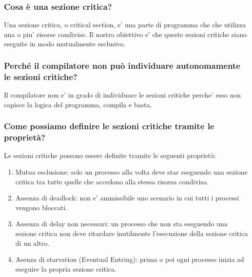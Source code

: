 \documentclass{article}
\begin{document}
\subsubsection{Cosa è una sezione critica?}
Una sezione critica, o critical section, e' una parte di programma che che
utilizza una o piu' risorse condivise. Il nostro obiettivo e' che queste
sezioni critiche siano eseguite in modo mutualmente esclusivo.

\subsubsection{Perché il compilatore non può individuare autonomamente le sezioni critiche?}
Il compilatore non e' in grado di individuare le sezioni critiche perche' esso
non capisce la logica del programma, compila e basta.

\subsubsection{Come possiamo definire le sezioni critiche tramite le proprietà?}
Le sezioni critiche possono essere definite tramite le seguenti proprietà:
\begin{enumerate}
    \item Mutua esclusione: solo un processo alla volta deve star eseguendo una sezione
          critica tra tutte quelle che accedono alla stessa risorsa condivisa.
    \item Assenza di deadlock: non e' ammissibile uno scenario in cui tutti i processi
          vengono bloccati.
    \item Assenza di delay non necessari: un processo che non sta eseguendo una sezione
          critica non deve ritardare inutilmente l'esecuzione della sezione critica di un
          altro.
    \item Asenza di starvation (Eventual Entring): prima o poi ogni processo inizia ad
          eseguire la propria sezione critica.
\end{enumerate}
\end{document}
